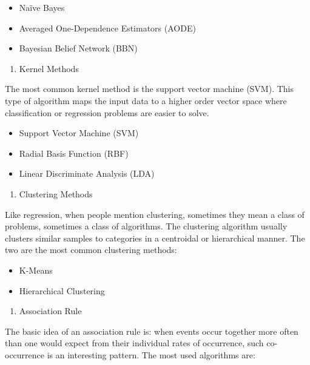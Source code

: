 \documentclass[]{book}
\providecommand{\tightlist}{%
  \setlength{\itemsep}{0pt}\setlength{\parskip}{0pt}}
\theoremstyle{definition}
\theoremstyle{definition}
\theoremstyle{remark}
\begin{document}
\begin{itemize}
\tightlist
\item
  Naïve Bayes
\item
  Averaged One-Dependence Estimators (AODE)
\item
  Bayesian Belief Network (BBN)
\end{itemize}

\begin{enumerate}
\def\labelenumi{\arabic{enumi}.}
\setcounter{enumi}{6}
\tightlist
\item
  Kernel Methods
\end{enumerate}

The most common kernel method is the support vector machine (SVM). This
type of algorithm maps the input data to a higher order vector space
where classification or regression problems are easier to solve.

\begin{itemize}
\tightlist
\item
  Support Vector Machine (SVM)
\item
  Radial Basis Function (RBF)
\item
  Linear Discriminate Analysis (LDA)
\end{itemize}

\begin{enumerate}
\def\labelenumi{\arabic{enumi}.}
\setcounter{enumi}{7}
\tightlist
\item
  Clustering Methods
\end{enumerate}

Like regression, when people mention clustering, sometimes they mean a
class of problems, sometimes a class of algorithms. The clustering
algorithm usually clusters similar samples to categories in a centroidal
or hierarchical manner. The two are the most common clustering methods:

\begin{itemize}
\tightlist
\item
  K-Means
\item
  Hierarchical Clustering
\end{itemize}

\begin{enumerate}
\def\labelenumi{\arabic{enumi}.}
\setcounter{enumi}{8}
\tightlist
\item
  Association Rule
\end{enumerate}

The basic idea of an association rule is: when events occur together
more often than one would expect from their individual rates of
occurrence, such co- occurrence is an interesting pattern. The most used
algorithms are:
\end{document}
